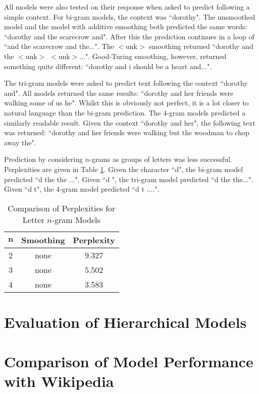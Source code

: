All models were also tested on their response when asked to predict following a simple context. For bi-gram models, the context was ``dorothy". The unsmoothed model and the model with additive smoothing both predicted the same words: ``dorothy and the scarecrow and". After this the prediction continues in a loop of ``and the scarecrow and the...". The $<$unk$>$ smoothing returned ``dorothy and the $<$unk$>$ $<$unk$>$...". Good-Turing smoothing, however, returned something quite different: ``dorothy and i should be a heart and...". 

The tri-gram models were asked to predict text following the context ``dorothy and". All models returned the same results: ``dorothy and her friends were walking some of us he". Whilst this is obviously not perfect, it is a lot closer to natural language than the bi-gram prediction. The 4-gram models predicted a similarly readable result. Given the context ``dorothy and her", the following text was returned: ``dorothy and her friends were walking but the woodman to chop away the".

Prediction by considering $n$-grams as groups of letters was less successful. Perplexities are given in Table \ref{table:letterPerplexity}. Given the character ``d", the bi-gram model predicted ``d the the ...". Given ``d ", the tri-gram model predicted ``d the the...". Given ``d t", the 4-gram model predicted ``d t    ....".

\begin{table}[h!]
\caption{Comparison of Perplexities for Letter $n$-gram Models}
\label{table:letterPerplexity}
\begin{center}
\begin{tabular}{|c|c|c|}
\hline
$\boldsymbol{n}$ & \textbf{Smoothing} & \textbf{Perplexity} \\ \hline
2 & none & 9.327 \\ \hline
3 & none & 5.502 \\ \hline
4 & none & 3.583 \\ \hline
\end{tabular}
\end{center}
\end{table}


\section{Evaluation of Hierarchical Models}


\section{Comparison of Model Performance with Wikipedia}

